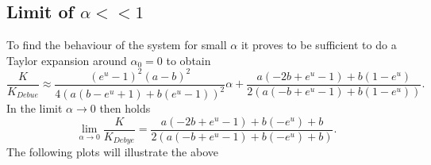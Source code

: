 \subsection{Limit of $\alpha << 1$}
To find the behaviour of the system for small $\alpha$ it proves to be sufficient to do a Taylor expansion around $\alpha_0 = 0$ to obtain
\begin{equation}
    \frac{K}{K_{Debue}} \approx \frac{\left(e^u-1\right)^2  (a-b)^2}{4 \left(a \left(b-e^u+1\right)+b \left(e^u-1\right)\right)^2} \alpha+\frac{a \left(-2 b+e^u-1\right)+b \left(1-e^u\right)}{2 \left(a \left(-b+e^u-1\right)+b \left(1-e^u\right)\right)}.
    \label{ksa}
\end{equation}
In the limit $\alpha \rightarrow 0$ then holds
\begin{equation}
    \lim_{\alpha \rightarrow 0} \frac{K}{K_{Debye}} = \frac{a \left(-2 b+e^u-1\right)+b \left(-e^u\right)+b}{2 \left(a \left(-b+e^u-1\right)+b \left(-e^u\right)+b\right)}.
    \label{klim0a}
\end{equation}
The following plots will illustrate the above \par
